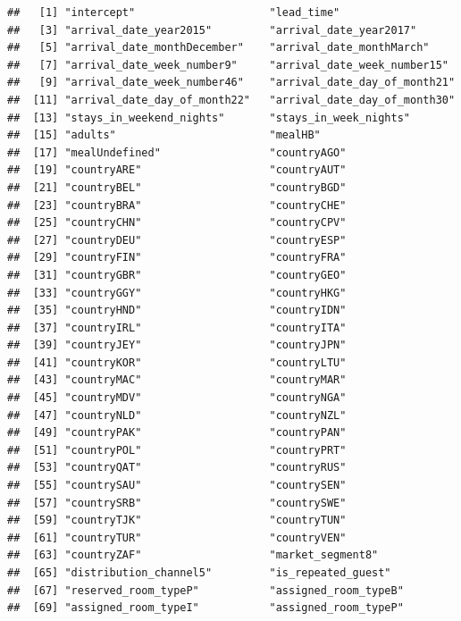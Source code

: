 \documentclass[
]{article}
\begin{document}
\begin{verbatim}
##   [1] "intercept"                     "lead_time"                    
##   [3] "arrival_date_year2015"         "arrival_date_year2017"        
##   [5] "arrival_date_monthDecember"    "arrival_date_monthMarch"      
##   [7] "arrival_date_week_number9"     "arrival_date_week_number15"   
##   [9] "arrival_date_week_number46"    "arrival_date_day_of_month21"  
##  [11] "arrival_date_day_of_month22"   "arrival_date_day_of_month30"  
##  [13] "stays_in_weekend_nights"       "stays_in_week_nights"         
##  [15] "adults"                        "mealHB"                       
##  [17] "mealUndefined"                 "countryAGO"                   
##  [19] "countryARE"                    "countryAUT"                   
##  [21] "countryBEL"                    "countryBGD"                   
##  [23] "countryBRA"                    "countryCHE"                   
##  [25] "countryCHN"                    "countryCPV"                   
##  [27] "countryDEU"                    "countryESP"                   
##  [29] "countryFIN"                    "countryFRA"                   
##  [31] "countryGBR"                    "countryGEO"                   
##  [33] "countryGGY"                    "countryHKG"                   
##  [35] "countryHND"                    "countryIDN"                   
##  [37] "countryIRL"                    "countryITA"                   
##  [39] "countryJEY"                    "countryJPN"                   
##  [41] "countryKOR"                    "countryLTU"                   
##  [43] "countryMAC"                    "countryMAR"                   
##  [45] "countryMDV"                    "countryNGA"                   
##  [47] "countryNLD"                    "countryNZL"                   
##  [49] "countryPAK"                    "countryPAN"                   
##  [51] "countryPOL"                    "countryPRT"                   
##  [53] "countryQAT"                    "countryRUS"                   
##  [55] "countrySAU"                    "countrySEN"                   
##  [57] "countrySRB"                    "countrySWE"                   
##  [59] "countryTJK"                    "countryTUN"                   
##  [61] "countryTUR"                    "countryVEN"                   
##  [63] "countryZAF"                    "market_segment8"              
##  [65] "distribution_channel5"         "is_repeated_guest"            
##  [67] "reserved_room_typeP"           "assigned_room_typeB"          
##  [69] "assigned_room_typeI"           "assigned_room_typeP"          

\end{verbatim}
\end{document}
